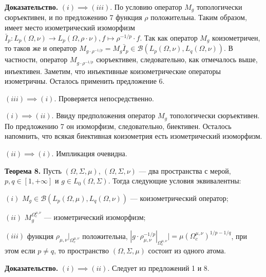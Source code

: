 \documentclass[11pt,twoside]{article}
\begin{document}
\textbf{Доказательство.} $(i)$$\implies$$ (iii)$. По условию оператор
$M_g$ топологически сюръективен, и по предложению 7 функция $\rho$
положительна. Таким образом, имеет место изометрический изоморфизм
$\bar{I}_p:L_p(\Omega,\nu)\to L_p(\Omega,\rho\cdot\nu),f\mapsto
\rho^{-1/p}\cdot f$. Так как оператор $M_g$ коизометричен, то таков же и
оператор $M_{g\cdot
\rho^{-1/p}}=M_g\bar{I}_p\in\mathcal{B}(L_p(\Omega,\nu),L_q(\Omega,\nu))$.
В частности, оператор $M_{g\cdot \rho^{-1/p}}$ сюръективен,
следовательно, как отмечалось выше, инъективен. Заметим, что инъективные
коизометрические операторы изометричны. Осталось применить предложение
6.

$(iii)$$\implies$$ (i)$. Проверяется непосредственно.

$(i)$$\implies$$ (ii)$. Ввиду предположения оператор $M_g$ топологически
сюръективен. По предложению 7 он изоморфизм, следовательно, биективен.
Осталось напомнить, что всякая биективная коизометрия есть
изометрический изоморфизм.

$(ii)$$\implies$$ (i)$. Импликация очевидна.

\textbf{Теорема 8.} Пусть $(\Omega,\Sigma,\mu)$, $(\Omega,\Sigma,\nu)$
--- два пространства с мерой, $p,q\in[1,+\infty]$ и $g\in
L_0(\Omega,\Sigma)$. Тогда следующие условия эквивалентны:

$(i)$ $M_g\in\mathcal{B}(L_p(\Omega,\mu), L_q(\Omega,\nu))$ ---
коизометрический оператор;

$(ii)$ $M_g^{\Omega_c^{\mu,\nu}}$ --- изометрический изоморфизм;

$(iii)$ функция $\rho_{\mu,\nu}|_{\Omega_c^{\mu,\nu}}$ положительна,
$|g\cdot\rho_{\mu,\nu}^{-1/p}|_{\Omega_c^{\mu,\nu}}|
={\mu(\Omega_c^{\mu,\nu})}^{1/p-1/q}$, при этом если $p\neq q$, то
пространство $(\Omega,\Sigma,\mu)$ состоит из одного атома.

\textbf{Доказательство.} $(i)$$\implies$$ (ii)$. Следует из предложений
1 и 8.
\end{document}
